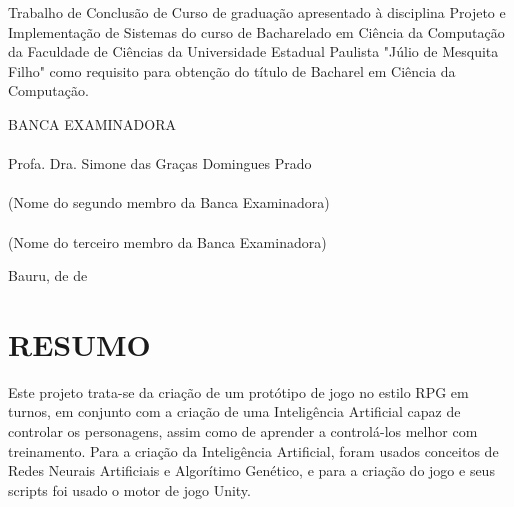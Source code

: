 \documentclass[12pt,a4paper]{article}
\begin{document}
\begin{articleobjective}
	Trabalho de Conclusão de Curso de graduação apresentado à disciplina Projeto e Implementação de Sistemas do curso de Bacharelado em Ciência da Computação da Faculdade de Ciências da Universidade Estadual Paulista "Júlio de Mesquita Filho" como requisito para obtenção do título de Bacharel em Ciência da Computação.
\end{articleobjective}

\begin{center}
	\vspace{1.0cm}
	BANCA EXAMINADORA\\
	
	\vspace{1.0cm}
	\underline{\hspace{8cm}}\\
	Profa. Dra. Simone das Graças Domingues Prado\\
	\vspace{1.0cm}
	\underline{\hspace{8cm}}\\
	(Nome do segundo membro da Banca Examinadora)\\
	\vspace{1.0cm}
	\underline{\hspace{8cm}}\\
	(Nome do terceiro membro da Banca Examinadora)

	\vspace*{\fill} %
	Bauru, \underline{\hspace{1cm}} de \underline{\hspace{3cm}} de \underline{\hspace{1.5cm}}
\end{center}

\newpage %
\thispagestyle{empty} %
\section*{\hfil RESUMO} %
	\singlespace
	\noindent
	Este projeto trata-se da criação de um protótipo de jogo no estilo RPG em turnos,
	em conjunto com a criação de uma Inteligência Artificial capaz de controlar os personagens,
	assim como de aprender a controlá-los melhor com treinamento.
	Para a criação da Inteligência Artificial,
	foram usados conceitos de Redes Neurais Artificiais e Algorítimo Genético,
	e para a criação do jogo e seus scripts
	foi usado o motor de jogo Unity.
	
\end{document}

